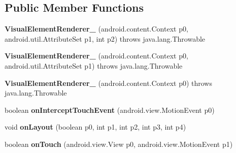\subsection*{Public Member Functions}
\begin{DoxyCompactItemize}
\item 
\mbox{\label{classmd5b60ffeb829f638581ab2bb9b1a7f4f3f_1_1_visual_element_renderer__1_a0cda467c85fce2d9022689cb94ec71d6}} 
{\bfseries Visual\+Element\+Renderer\+\_} (android.\+content.\+Context p0, android.\+util.\+Attribute\+Set p1, int p2)  throws java.\+lang.\+Throwable 	
\item 
\mbox{\label{classmd5b60ffeb829f638581ab2bb9b1a7f4f3f_1_1_visual_element_renderer__1_acec8fdec15887080a4ca53e275938cc9}} 
{\bfseries Visual\+Element\+Renderer\+\_} (android.\+content.\+Context p0, android.\+util.\+Attribute\+Set p1)  throws java.\+lang.\+Throwable 	
\item 
\mbox{\label{classmd5b60ffeb829f638581ab2bb9b1a7f4f3f_1_1_visual_element_renderer__1_accf7106e42d6c5739ba4e1dec553a0e6}} 
{\bfseries Visual\+Element\+Renderer\+\_} (android.\+content.\+Context p0)  throws java.\+lang.\+Throwable 	
\item 
\mbox{\label{classmd5b60ffeb829f638581ab2bb9b1a7f4f3f_1_1_visual_element_renderer__1_af640d27a1867f3d3c63a835f6fd57ecf}} 
boolean {\bfseries on\+Intercept\+Touch\+Event} (android.\+view.\+Motion\+Event p0)
\item 
\mbox{\label{classmd5b60ffeb829f638581ab2bb9b1a7f4f3f_1_1_visual_element_renderer__1_a8c7af843aeec04827cb3a3981ea1978d}} 
void {\bfseries on\+Layout} (boolean p0, int p1, int p2, int p3, int p4)
\item 
\mbox{\label{classmd5b60ffeb829f638581ab2bb9b1a7f4f3f_1_1_visual_element_renderer__1_a3ada7324060653b4f27ece3f40d1db7e}} 
boolean {\bfseries on\+Touch} (android.\+view.\+View p0, android.\+view.\+Motion\+Event p1)

\end{DoxyCompactItemize}
